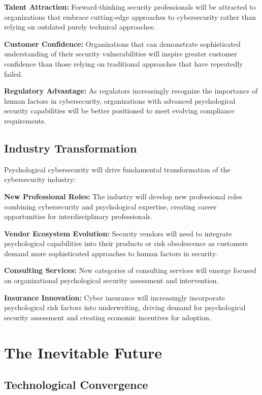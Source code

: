 \documentclass[10pt, twocolumn]{article}
\begin{document}
\textbf{Talent Attraction:} Forward-thinking security professionals will be attracted to organizations that embrace cutting-edge approaches to cybersecurity rather than relying on outdated purely technical approaches.

\textbf{Customer Confidence:} Organizations that can demonstrate sophisticated understanding of their security vulnerabilities will inspire greater customer confidence than those relying on traditional approaches that have repeatedly failed.

\textbf{Regulatory Advantage:} As regulators increasingly recognize the importance of human factors in cybersecurity, organizations with advanced psychological security capabilities will be better positioned to meet evolving compliance requirements.

\subsection{Industry Transformation}

Psychological cybersecurity will drive fundamental transformation of the cybersecurity industry:

\textbf{New Professional Roles:} The industry will develop new professional roles combining cybersecurity and psychological expertise, creating career opportunities for interdisciplinary professionals.

\textbf{Vendor Ecosystem Evolution:} Security vendors will need to integrate psychological capabilities into their products or risk obsolescence as customers demand more sophisticated approaches to human factors in security.

\textbf{Consulting Services:} New categories of consulting services will emerge focused on organizational psychological security assessment and intervention.

\textbf{Insurance Innovation:} Cyber insurance will increasingly incorporate psychological risk factors into underwriting, driving demand for psychological security assessment and creating economic incentives for adoption.

\section{The Inevitable Future}

\subsection{Technological Convergence}
\end{document}
